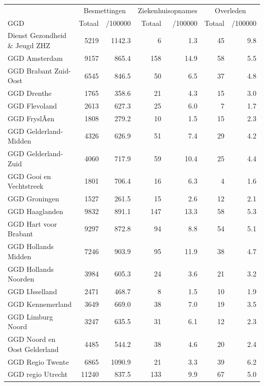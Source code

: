 \documentclass[
  english,
  man,floatsintext]{apa6}
\begin{document}
\begin{table}[H]
\centering\begingroup\fontsize{10}{12}\selectfont

\begin{threeparttable}
\begin{tabular}{lrrrrrr}
\toprule
\multicolumn{1}{c}{ } & \multicolumn{2}{c}{Besmettingen} & \multicolumn{2}{c}{Ziekenhuisopnames} & \multicolumn{2}{c}{Overleden} \\
\cmidrule(l{3pt}r{3pt}){2-3} \cmidrule(l{3pt}r{3pt}){4-5} \cmidrule(l{3pt}r{3pt}){6-7}
GGD & Totaal & /100000 & Totaal & /100000 & Totaal & /100000\\
\midrule
Dienst Gezondheid \& Jeugd ZHZ & 5219 & 1142.3 & 6 & 1.3 & 45 & 9.8\\
GGD Amsterdam & 9157 & 865.4 & 158 & 14.9 & 58 & 5.5\\
GGD Brabant Zuid-Oost & 6545 & 846.5 & 50 & 6.5 & 37 & 4.8\\
GGD Drenthe & 1765 & 358.6 & 21 & 4.3 & 15 & 3.0\\
GGD Flevoland & 2613 & 627.3 & 25 & 6.0 & 7 & 1.7\\
GGD FryslÃ¢n & 1808 & 279.2 & 10 & 1.5 & 15 & 2.3\\
GGD Gelderland-Midden & 4326 & 626.9 & 51 & 7.4 & 29 & 4.2\\
GGD Gelderland-Zuid & 4060 & 717.9 & 59 & 10.4 & 25 & 4.4\\
GGD Gooi en Vechtstreek & 1801 & 706.4 & 16 & 6.3 & 4 & 1.6\\
GGD Groningen & 1527 & 261.5 & 15 & 2.6 & 12 & 2.1\\
GGD Haaglanden & 9832 & 891.1 & 147 & 13.3 & 58 & 5.3\\
GGD Hart voor Brabant & 9297 & 872.8 & 94 & 8.8 & 54 & 5.1\\
GGD Hollands Midden & 7246 & 903.9 & 95 & 11.9 & 38 & 4.7\\
GGD Hollands Noorden & 3984 & 605.3 & 24 & 3.6 & 21 & 3.2\\
GGD IJsselland & 2471 & 468.7 & 8 & 1.5 & 10 & 1.9\\
GGD Kennemerland & 3649 & 669.0 & 38 & 7.0 & 19 & 3.5\\
GGD Limburg Noord & 3247 & 635.5 & 31 & 6.1 & 12 & 2.3\\
GGD Noord en Oost Gelderland & 4485 & 544.2 & 38 & 4.6 & 20 & 2.4\\
GGD Regio Twente & 6865 & 1090.9 & 21 & 3.3 & 39 & 6.2\\
GGD regio Utrecht & 11240 & 837.5 & 133 & 9.9 & 67 & 5.0\\

\end{tabular}
\end{threeparttable}
\end{table}
\end{document}
